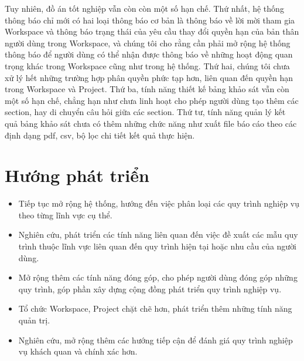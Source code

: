 \par
Tuy nhiên, đồ án tốt nghiệp vẫn còn còn một số hạn chế. Thứ nhất, hệ thống thông báo chỉ mới có hai loại thông báo cơ bản 
là thông báo về lời mời tham gia Workspace và thông báo trạng thái của yêu cầu thay đổi quyền hạn của bản thân người dùng 
trong Workspace, và chúng tôi cho rằng cần phải mở rộng hệ thống thông báo để người dùng có thể nhận được thông báo về những 
hoạt động quan trọng khác trong Workspace cũng như trong hệ thống. Thứ hai, chúng tôi chưa xử lý hết những trường hợp 
phân quyền phức tạp hơn, liên quan đến quyền hạn trong Workspace và Project. Thứ ba, tính năng thiết kế bảng khảo sát 
vẫn còn một số hạn chế, chẳng hạn như chưa linh hoạt cho phép người dùng tạo thêm các section, hay di chuyển câu hỏi 
giữa các section. Thứ tư, tính năng quản lý kết quả bảng khảo sát chưa có thêm những chức năng như xuất file báo cáo 
theo các định dạng pdf, csv, bộ lọc chi tiết kết quả thực hiện.

\section{Hướng phát triển}
\begin{itemize}
    \item Tiếp tục mở rộng hệ thống, hướng đến việc phân loại các quy trình nghiệp vụ theo từng lĩnh vực cụ thể.
    \item Nghiên cứu, phát triển các tính năng liên quan đến việc đề xuất các mẫu quy trình thuộc lĩnh vực liên quan đến quy trình hiện tại hoặc nhu cầu của người dùng.
    \item Mở rộng thêm các tính năng đóng góp, cho phép người dùng đóng góp những quy trình, góp phần xây dựng cộng đồng phát triển quy trình nghiệp vụ.
    \item Tổ chức Workspace, Project chặt chẽ hơn, phát triển thêm những tính năng quản trị.
    \item Nghiên cứu, mở rộng thêm các hướng tiếp cận để đánh giá quy trình nghiệp vụ khách quan và chính xác hơn.
\end{itemize}